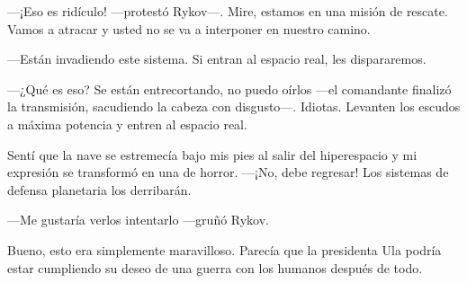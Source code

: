 —¡Eso es ridículo! —protestó Rykov—. Mire, estamos en una misión de rescate. Vamos a atracar y usted no se va a interponer en nuestro camino.

—Están invadiendo este sistema. Si entran al espacio real, les dispararemos.

—¿Qué es eso? Se están entrecortando, no puedo oírlos —el comandante finalizó la transmisión, sacudiendo la cabeza con disgusto—. Idiotas. Levanten los escudos a máxima potencia y entren al espacio real.

Sentí que la nave se estremecía bajo mis pies al salir del hiperespacio y mi expresión se transformó en una de horror. —¡No, debe regresar! Los sistemas de defensa planetaria los derribarán.

—Me gustaría verlos intentarlo —gruñó Rykov.

Bueno, esto era simplemente maravilloso. Parecía que la presidenta Ula podría estar cumpliendo su deseo de una guerra con los humanos después de todo.